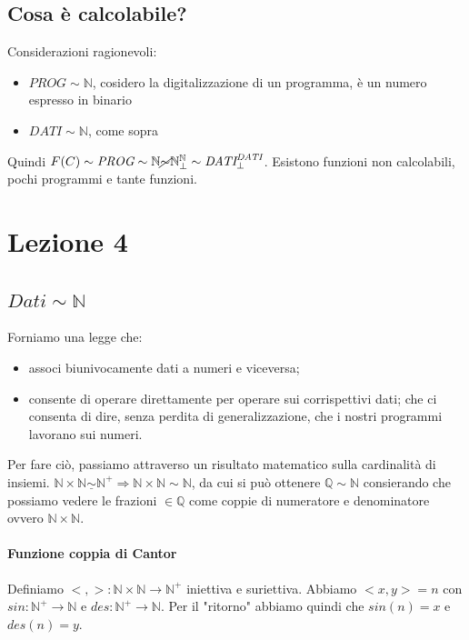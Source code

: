 \documentclass{article}
\begin{document}
\subsection{Cosa è calcolabile?}
Considerazioni ragionevoli:
\begin{itemize}
	\item $\textit{PROG} \sim \mathbb{N}$, cosidero la digitalizzazione di un programma, è un numero espresso in binario
	\item $\textit{DATI} \sim \mathbb{N}$, come sopra
\end{itemize}
Quindi $F(C) \sim \textit{PROG} \sim \mathbb{N} \cancel{\sim} \mathbb{N}^{\mathbb{N}}_{\perp} \sim \textit{DATI}^{\textit{DATI}}_{\perp}$. Esistono funzioni non calcolabili, pochi programmi e tante funzioni.

\section{Lezione 4}
\subsection{$\textit{Dati} \sim \mathbb{N}$}
Forniamo una legge che:
\begin{itemize}
	\item associ biunivocamente dati a numeri e viceversa;
	\item consente di operare direttamente per operare sui corrispettivi dati;
	che ci consenta di dire, senza perdita di generalizzazione, che i nostri programmi lavorano sui numeri.
\end{itemize}
Per fare ciò, passiamo attraverso un risultato matematico sulla cardinalità di insiemi. $ \mathbb{N} \times \mathbb{N} \underline{\sim} \mathbb{N}^{+} \Rightarrow \mathbb{N} \times \mathbb{N} {\sim} \mathbb{N}$, da cui si può ottenere $ \mathbb{Q} \sim \mathbb{N} $ consierando che possiamo vedere le frazioni $ \in \mathbb{Q} $ come coppie di numeratore e denominatore ovvero $ \mathbb{N} \times \mathbb{N} $.
\paragraph{Funzione coppia di Cantor}
Definiamo $ <  ,  > : \mathbb{N} \times \mathbb{N} \rightarrow \mathbb{N}^{+} $ iniettiva e suriettiva. Abbiamo $<x,y>=n$ con $\textit{sin}: \mathbb{N}^{+} \rightarrow \mathbb{N}$ e $\textit{des}: \mathbb{N}^{+} \rightarrow \mathbb{N}$. Per il "ritorno" abbiamo quindi che $\textit{sin}(n)=x$ e $\textit{des}(n)=y$.
\end{document}
